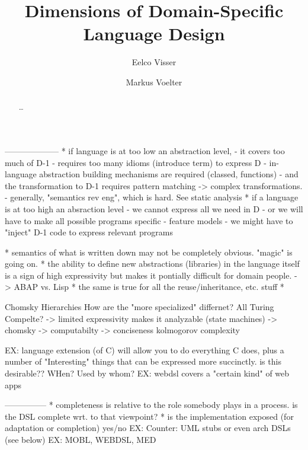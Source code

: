 \documentclass[submission,copyright,creativecommons]{eptcs}
\title{Dimensions of Domain-Specific Language Design}
\author{Eelco Visser
\institute{Delft University of Technology}
\email{visser@acm.org}
\and
Markus Voelter 
\institute{Independent}
\email{voelter@acm.org}
}
\begin{document}
\maketitle

\begin{abstract}
\ldots
\end{abstract}




--------------------	
   * if language is at too low an abstraction level,
     - it covers too much of D-1
     - requires too many idioms (introduce term) to express D
     - in-language abstraction building mechanisms are required
       (classed, functions)
     - and the transformation to D-1 requires pattern matching ->
       complex transformations.
     - generally, "semantics rev eng", which is hard. See static
       analysis
   * if a language is at too high an absraction level
     - we cannot express all we need in D
     - or we will have to make all possible programs
       specific - feature models
     - we might have to "inject" D-1 code to express relevant
       programs

       * semantics of what is written down may not be completely obvious.
         "magic" is going on.
       * the ability to define new abstractions (libraries) in the language
         itself is a sign of high expressivity but makes it pontially difficult
         for domain people.
         -> ABAP vs. Lisp
       * the same is true for all the reuse/inheritance, etc. stuff
	* 
	
	Chomsky Hierarchies
	How are the "more specialized" differnet? All Turing Compelte?
	-> limited expressivity makes it analyzable (state machines) -> chomsky
	-> computabilty
	-> conciseness kolmogorov complexity




    
    EX: language extension (of C) will allow you to do everything C does,
        plus a number of "Interesting" things that can be expressed more
        succinctly. is this desirable?? WHen? Used by whom?
    EX: webdsl covers a "certain kind" of web apps










	---------------
	* completeness is relative to the role somebody plays in a process.
	  is the DSL complete wrt. to that viewpoint?
	* is the implementation exposed (for adaptation or completion) yes/no
	  EX: Counter: UML stubs or even arch DSLs (see below)
	  EX: MOBL, WEBDSL, MED
\end{document}
